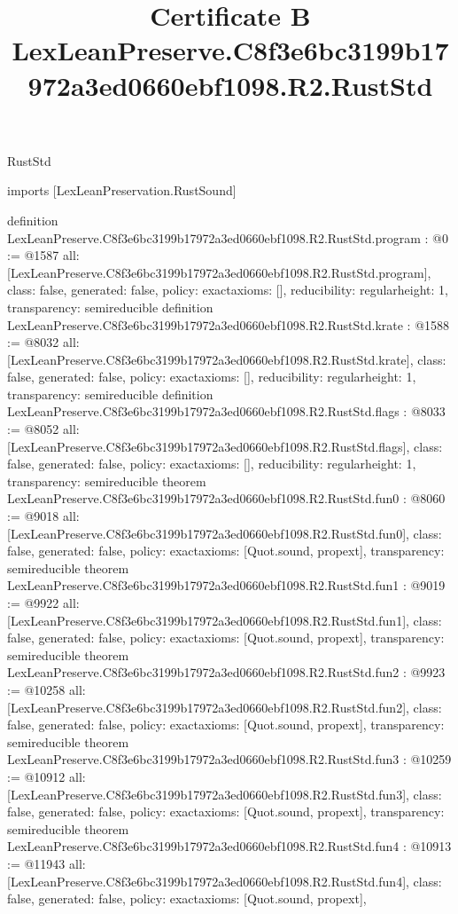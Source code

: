 \begin{lexlean}{RustStd}
\title{Certificate B LexLeanPreserve.C8f3e6bc3199b17972a3ed0660ebf1098.R2.RustStd}
\begin{coremodule}
imports [LexLeanPreservation.RustSound]

definition LexLeanPreserve.C8f3e6bc3199b17972a3ed0660ebf1098.R2.RustStd.program : @0 := @1587 {
  all: [LexLeanPreserve.C8f3e6bc3199b17972a3ed0660ebf1098.R2.RustStd.program],
  class: false,
  generated: false,
  policy: exact{axioms: []},
  reducibility: regular{height: 1},
  transparency: semireducible
}
definition LexLeanPreserve.C8f3e6bc3199b17972a3ed0660ebf1098.R2.RustStd.krate : @1588 := @8032 {
  all: [LexLeanPreserve.C8f3e6bc3199b17972a3ed0660ebf1098.R2.RustStd.krate],
  class: false,
  generated: false,
  policy: exact{axioms: []},
  reducibility: regular{height: 1},
  transparency: semireducible
}
definition LexLeanPreserve.C8f3e6bc3199b17972a3ed0660ebf1098.R2.RustStd.flags : @8033 := @8052 {
  all: [LexLeanPreserve.C8f3e6bc3199b17972a3ed0660ebf1098.R2.RustStd.flags],
  class: false,
  generated: false,
  policy: exact{axioms: []},
  reducibility: regular{height: 1},
  transparency: semireducible
}
theorem LexLeanPreserve.C8f3e6bc3199b17972a3ed0660ebf1098.R2.RustStd.fun0 : @8060 := @9018 {
  all: [LexLeanPreserve.C8f3e6bc3199b17972a3ed0660ebf1098.R2.RustStd.fun0],
  class: false,
  generated: false,
  policy: exact{axioms: [Quot.sound, propext]},
  transparency: semireducible
}
theorem LexLeanPreserve.C8f3e6bc3199b17972a3ed0660ebf1098.R2.RustStd.fun1 : @9019 := @9922 {
  all: [LexLeanPreserve.C8f3e6bc3199b17972a3ed0660ebf1098.R2.RustStd.fun1],
  class: false,
  generated: false,
  policy: exact{axioms: [Quot.sound, propext]},
  transparency: semireducible
}
theorem LexLeanPreserve.C8f3e6bc3199b17972a3ed0660ebf1098.R2.RustStd.fun2 : @9923 := @10258 {
  all: [LexLeanPreserve.C8f3e6bc3199b17972a3ed0660ebf1098.R2.RustStd.fun2],
  class: false,
  generated: false,
  policy: exact{axioms: [Quot.sound, propext]},
  transparency: semireducible
}
theorem LexLeanPreserve.C8f3e6bc3199b17972a3ed0660ebf1098.R2.RustStd.fun3 : @10259 := @10912 {
  all: [LexLeanPreserve.C8f3e6bc3199b17972a3ed0660ebf1098.R2.RustStd.fun3],
  class: false,
  generated: false,
  policy: exact{axioms: [Quot.sound, propext]},
  transparency: semireducible
}
theorem LexLeanPreserve.C8f3e6bc3199b17972a3ed0660ebf1098.R2.RustStd.fun4 : @10913 := @11943 {
  all: [LexLeanPreserve.C8f3e6bc3199b17972a3ed0660ebf1098.R2.RustStd.fun4],
  class: false,
  generated: false,
  policy: exact{axioms: [Quot.sound, propext]},
}
\end{coremodule}
\end{lexlean}
